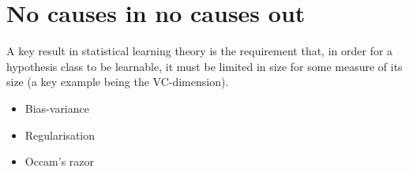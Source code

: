 \section{No causes in no causes out}

A key result in statistical learning theory is the requirement that, in order for a hypothesis class to be learnable, it must be limited in size for some measure of its size (a key example being the VC-dimension). 

\begin{itemize}
\item Bias-variance
\item Regularisation
\item Occam's razor
\end{itemize}